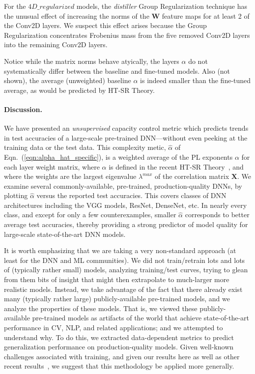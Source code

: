 For the $4D\_regularized$ models, the \emph{distiller} Group Regularization technique has the unusual effect of increasing the norms of the $\mathbf{W}$ feature maps for at least 2 of the Conv2D layers.
We suspect this effect arises because the Group Regularization concentrates Frobenius mass from the five removed Conv2D layers into the remaining Conv2D layers.

Notice while the matrix norms behave atyically, the layers $\alpha$ do not systematically differ between the baseline and fine-tuned models.
Also (not shown), the average (unweighted) baseline $\alpha$ is indeed smaller than the fine-tuned average, as would be predicted by HT-SR Theory.

\vspace{-2mm}
\paragraph{Discussion.}

We have presented an \emph{unsupervised} capacity control metric which predicts trends in test accuracies of a large-scale pre-trained DNN---without even peeking at the training data or the test data. 
This complexity metic, $\hat{\alpha}$ of Eqn.~(\ref{eqn:alpha_hat_specific}), is a weighted average of the PL exponents $\alpha$ for each layer weight matrix, where $\alpha$ is defined in the recent HT-SR Theory~\cite{MM18_TR,MM19_HTSR_ICML}, and where the weights are the largest eigenvalue $\lambda^{max}$ of the correlation matrix $\mathbf{X}$.  
%
We examine several commonly-available, pre-trained, production-quality DNNs, by plotting $\hat{\alpha}$ versus the reported test accuracies.
This covers classes of DNN architectures including the VGG models, ResNet, DenseNet, etc. 
In nearly every class, and except for only a few counterexamples, smaller $\hat{\alpha}$ corresponds to better average test accuracies, thereby providing a strong predictor of model quality for large-scale state-of-the-art DNN models.

It is worth emphasizing that we are taking a very non-standard approach (at least for the DNN and ML communities).
We did not train/retrain lots and lots of (typically rather small) models, analyzing training/test curves, trying to glean from them bits of insight that might then extrapolate to much-larger more realistic models.
Instead, we take advantage of the fact that there already exist many (typically rather large) publicly-available pre-trained models, and we analyze the properties of these models.
That is, we viewed these publicly-available pre-trained models as artifacts of the world that achieve state-of-the-art performance in CV, NLP, and related applications; and we attempted to understand why.
To do this, we extracted data-dependent metrics to predict generalization performance on production-quality models.
Given well-known challenges associated with training, and given our results here as well as other recent results~\cite{MM18_TR,MM19_HTSR_ICML},
we suggest that this methodology be applied more generally.

